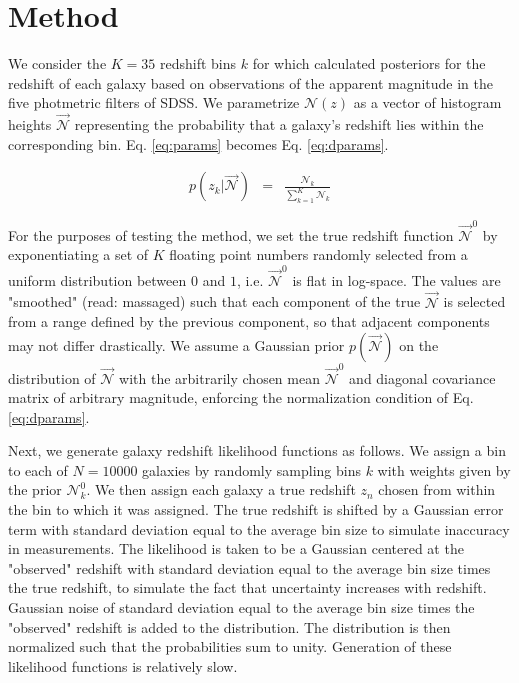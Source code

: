 \documentclass[12pt, onecolumn]{emulateapj}
\begin{document}
\section{Method}

We consider the $K=35$ redshift bins $k$ for which \citet{she11} calculated posteriors for the redshift of each galaxy based on observations of the apparent magnitude in the five photmetric filters of SDSS.  We parametrize $\mathcal{N}(z)$ as a vector of histogram heights $\vec{\mathcal{N}}$ representing the probability that a galaxy's redshift lies within the corresponding bin.  Eq. \ref{eq:params} becomes Eq. \ref{eq:dparams}.

\begin{eqnarray}
\label{eq:dparams}
p(z_{k}|\vec{\mathcal{N}}) &=& \frac{\mathcal{N}_{k}}{\sum_{k=1}^{K}\mathcal{N}_{k}}
\end{eqnarray}

For the purposes of testing the method, we set the true redshift function $\vec{\mathcal{N}}^{0}$ by exponentiating a set of $K$ floating point numbers randomly selected from a uniform distribution between $0$ and $1$, i.e. $\vec{\mathcal{N}}^{0}$ is flat in log-space.  The values are "smoothed" (read: massaged) such that each component of the true $\vec{\mathcal{N}}$ is selected from a range defined by the previous component, so that adjacent components may not differ drastically.  We assume a Gaussian prior $p(\vec{\mathcal{N}})$ on the distribution of $\vec{\mathcal{N}}$ with the arbitrarily chosen mean $\vec{\mathcal{N}}^{0}$ and diagonal covariance matrix of arbitrary magnitude, enforcing the normalization condition of Eq. \ref{eq:dparams}.

Next, we generate galaxy redshift likelihood functions as follows.  We assign a bin to each of $N=10000$ galaxies by randomly sampling bins $k$ with weights given by the prior $\mathcal{N}^{0}_{k}$.  We then assign each galaxy a true redshift $z_{n}$ chosen from within the bin to which it was assigned.  The true redshift is shifted by a Gaussian error term with standard deviation equal to the average bin size to simulate inaccuracy in measurements.  The likelihood is taken to be a Gaussian centered at the "observed" redshift with standard deviation equal to the average bin size times the true redshift, to simulate the fact that uncertainty increases with redshift.  Gaussian noise of standard deviation equal to the average bin size times the "observed" redshift is added to the distribution.  The distribution is then normalized such that the probabilities sum to unity.  Generation of these likelihood functions is relatively slow.
\end{document}

